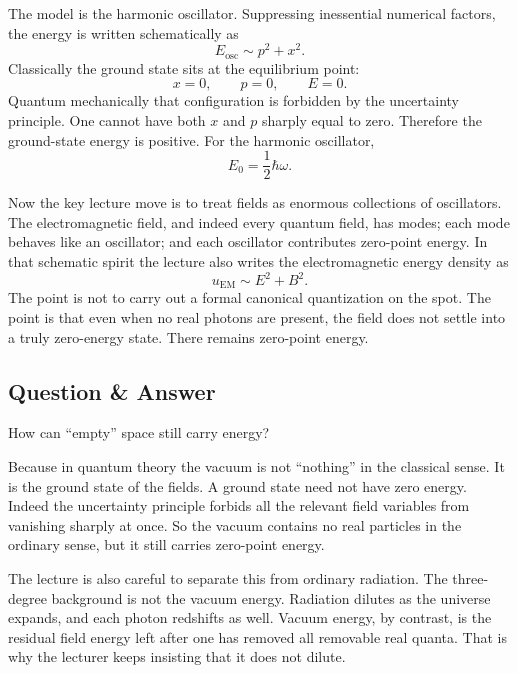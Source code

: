 The model is the harmonic oscillator. Suppressing inessential numerical factors, the energy is written schematically as
\begin{equation}
E_{\mathrm{osc}}\sim p^2+x^2.
\end{equation}
Classically the ground state sits at the equilibrium point:
\begin{equation}
x=0,\qquad p=0,\qquad E=0.
\end{equation}
Quantum mechanically that configuration is forbidden by the uncertainty principle. One cannot have both \(x\) and \(p\) sharply equal to zero. Therefore the ground-state energy is positive. For the harmonic oscillator,
\begin{equation}
E_0=\frac{1}{2}\hbar\omega.
\end{equation}

Now the key lecture move is to treat fields as enormous collections of oscillators. The electromagnetic field, and indeed every quantum field, has modes; each mode behaves like an oscillator; and each oscillator contributes zero-point energy. In that schematic spirit the lecture also writes the electromagnetic energy density as
\begin{equation}
u_{\mathrm{EM}}\sim E^2+B^2.
\end{equation}
The point is not to carry out a formal canonical quantization on the spot. The point is that even when no real photons are present, the field does not settle into a truly zero-energy state. There remains zero-point energy.

\subsection{Question \& Answer}

How can ``empty'' space still carry energy?

Because in quantum theory the vacuum is not ``nothing'' in the classical sense. It is the ground state of the fields. A ground state need not have zero energy. Indeed the uncertainty principle forbids all the relevant field variables from vanishing sharply at once. So the vacuum contains no real particles in the ordinary sense, but it still carries zero-point energy.

The lecture is also careful to separate this from ordinary radiation. The three-degree background is not the vacuum energy. Radiation dilutes as the universe expands, and each photon redshifts as well. Vacuum energy, by contrast, is the residual field energy left after one has removed all removable real quanta. That is why the lecturer keeps insisting that it does not dilute.

